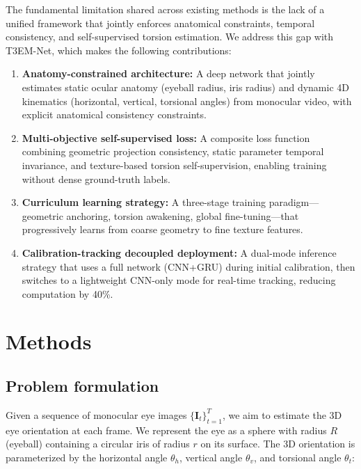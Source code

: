 \documentclass[review]{elsarticle}
\begin{document}
The fundamental limitation shared across existing methods is the lack of a unified framework that jointly enforces anatomical constraints, temporal consistency, and self-supervised torsion estimation. We address this gap with T3EM-Net, which makes the following contributions:

\begin{enumerate}
    \item \textbf{Anatomy-constrained architecture:} A deep network that jointly estimates static ocular anatomy (eyeball radius, iris radius) and dynamic 4D kinematics (horizontal, vertical, torsional angles) from monocular video, with explicit anatomical consistency constraints.
    \item \textbf{Multi-objective self-supervised loss:} A composite loss function combining geometric projection consistency, static parameter temporal invariance, and texture-based torsion self-supervision, enabling training without dense ground-truth labels.
    \item \textbf{Curriculum learning strategy:} A three-stage training paradigm---geometric anchoring, torsion awakening, global fine-tuning---that progressively learns from coarse geometry to fine texture features.
    \item \textbf{Calibration-tracking decoupled deployment:} A dual-mode inference strategy that uses a full network (CNN+GRU) during initial calibration, then switches to a lightweight CNN-only mode for real-time tracking, reducing computation by 40\%.
\end{enumerate}

\section{Methods}

\subsection{Problem formulation}

Given a sequence of monocular eye images $\{\mathbf{I}_t\}_{t=1}^{T}$, we aim to estimate the 3D eye orientation at each frame. We represent the eye as a sphere with radius $R$ (eyeball) containing a circular iris of radius $r$ on its surface. The 3D orientation is parameterized by the horizontal angle $\theta_h$, vertical angle $\theta_v$, and torsional angle $\theta_t$:
\end{document}
